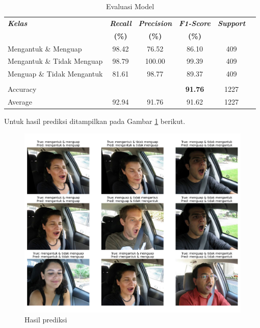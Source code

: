         \begin{table}[H]
        \centering
        \caption{Evaluasi Model}
        \begin{tabular}{lccccc}
            \toprule
            \textbf{\textit{Kelas}} & \textbf{\textit{Recall}} & \textbf{\textit{Precision}} &\textbf{\textit{F1-Score}} & \textbf{\textit{Support }}\\
            
              & \textbf{(\%)} & \textbf{(\%)} & \textbf{(\%)} \\
            \midrule
            Mengantuk \& Menguap & 98.42 & 76.52 & 86.10 & 409 \\
            Mengantuk \& Tidak Menguap & 98.79 & 100.00 & 99.39 & 409 \\
            Menguap \& Tidak Mengantuk & 81.61 & 98.77 & 89.37 & 409 \\ \hline
            & & & & \\
            Accuracy & & & \textbf{91.76} & 1227 \\
            Average & 92.94 & 91.76 & 91.62 & 1227 \\
      
          
             \bottomrule
        \end{tabular}
        \label{Evaluasi Model}
    \end{table}

    Untuk hasil prediksi ditampilkan pada Gambar \ref{hasil prediksi} berikut.
          \begin{figure}[H]
              \centering
              \includegraphics[width=1.0\linewidth]{figures/bab4/hasil_prediksi.png}
              \caption{Hasil prediksi}
              \label{hasil prediksi}
          \end{figure}

